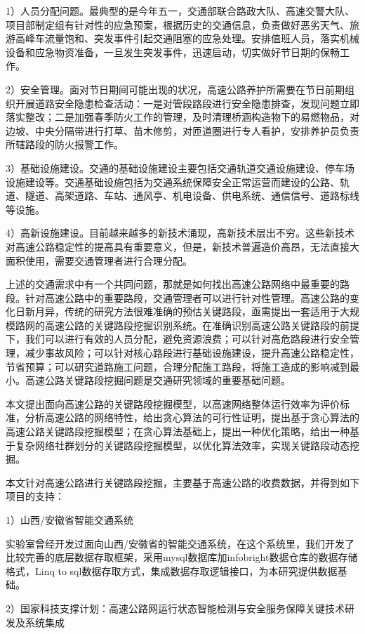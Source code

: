 1）人员分配问题。最典型的是今年五一，交通部联合路政大队、高速交警大队、项目部制定组有针对性的应急预案，根据历史的交通信息，负责做好恶劣天气、旅游高峰车流量饱和、突发事件引起交通阻塞的应急处理。安排值班人员，落实机械设备和应急物资准备，一旦发生突发事件，迅速启动，切实做好节日期的保畅工作。

2）安全管理。面对节日期间可能出现的状况，高速公路养护所需要在节日前期组织开展道路安全隐患检查活动：一是对管段路段进行安全隐患排查，发现问题立即落实整改；二是加强春季防火工作的管理，及时清理桥涵构造物下的易燃物品，对边坡、中央分隔带进行打草、苗木修剪，对匝道圈进行专人看护，安排养护员负责所辖路段的防火报警工作。

3）基础设施建设。交通的基础设施建设主要包括交通轨道交通设施建设、停车场设施建设等。交通基础设施包括为交通系统保障安全正常运营而建设的公路、轨道、隧道、高架道路、车站、通风亭、机电设备、供电系统、通信信号、道路标线等设施。

4）高新设施建设。目前越来越多的新技术涌现，高新技术层出不穷\parencite{ysk2017qx}。这些新技术对高速公路稳定性的提高具有重要意义，但是，新技术普遍造价高昂，无法直接大面积使用，需要交通管理者进行合理分配。

上述的交通需求中有一个共同问题，那就是如何找出高速公路网络中最重要的路段。针对高速公路中的重要路段，交通管理者可以进行针对性管理。高速公路的变化日新月异，传统的研究方法很难准确的预估关键路段，亟需提出一套适用于大规模路网的高速公路的关键路段挖掘识别系统。在准确识别高速公路关键路段的前提下，我们可以进行有效的人员分配，避免资源浪费；可以针对高危路段进行安全管理，减少事故风险；可以针对核心路段进行基础设施建设，提升高速公路稳定性，节省预算；可以研究道路施工问题，合理分配施工路段，将施工造成的影响减到最小。高速公路关键路段挖掘问题是交通研究领域的重要基础问题。

本文提出面向高速公路的关键路段挖掘模型，以高速网络整体运行效率为评价标准，分析高速公路的网络特性，给出贪心算法的可行性证明，提出基于贪心算法的高速公路关键路段挖掘模型；在贪心算法基础上，提出一种优化策略，给出一种基于复杂网络社群划分的关键路段挖掘模型，以优化算法效率，实现关键路段动态挖掘。

本文针对高速公路进行关键路段挖掘，主要基于高速公路的收费数据，并得到如下项目的支持：

1）山西/安徽省智能交通系统

	实验室曾经开发过面向山西/安徽省的智能交通系统，在这个系统里，我们开发了比较完善的底层数据存取框架，采用mysql数据库加infobright数据仓库的数据存储格式，Linq to sql数据存取方式，集成数据存取逻辑接口，为本研究提供数据基础。

2）国家科技支撑计划：高速公路网运行状态智能检测与安全服务保障关键技术研发及系统集成
	


